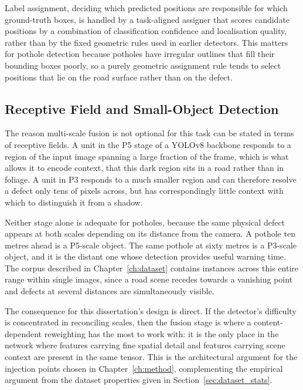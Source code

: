 \documentclass[MScCS]{uccthesis}
\begin{document}
Label assignment, deciding which predicted positions are responsible for
which ground-truth boxes, is handled by a task-aligned assigner that scores
candidate positions by a combination of classification confidence and
localisation quality, rather than by the fixed geometric rules used in earlier
detectors. This matters for pothole detection because potholes have irregular
outlines that fill their bounding boxes poorly, so a purely geometric
assignment rule tends to select positions that lie on the road surface rather
than on the defect.

\subsection{Receptive Field and Small-Object Detection}

The reason multi-scale fusion is not optional for this task can be stated in
terms of receptive fields. A unit in the P5 stage of a YOLOv8 backbone responds
to a region of the input image spanning a large fraction of the frame, which is
what allows it to encode context, that this dark region sits in a road rather
than in foliage. A unit in P3 responds to a much smaller region and can
therefore resolve a defect only tens of pixels across, but has correspondingly
little context with which to distinguish it from a shadow.

Neither stage alone is adequate for potholes, because the same physical defect
appears at both scales depending on its distance from the camera. A pothole ten
metres ahead is a P5-scale object. The same pothole at sixty metres is a
P3-scale object, and it is the distant one whose detection provides useful
warning time. The corpus described in Chapter~\ref{ch:dataset} contains
instances across this entire range within single images, since a road scene
recedes towards a vanishing point and defects at several distances are
simultaneously visible.

The consequence for this dissertation's design is direct. If the detector's
difficulty is concentrated in reconciling scales, then the fusion stage is
where a content-dependent reweighting has the most to work with: it is the
only place in the network where features carrying fine spatial detail and
features carrying scene context are present in the same tensor. This is the
architectural argument for the injection points chosen in
Chapter~\ref{ch:method}, complementing the empirical argument from the dataset
properties given in Section~\ref{sec:dataset_stats}.
\end{document}
